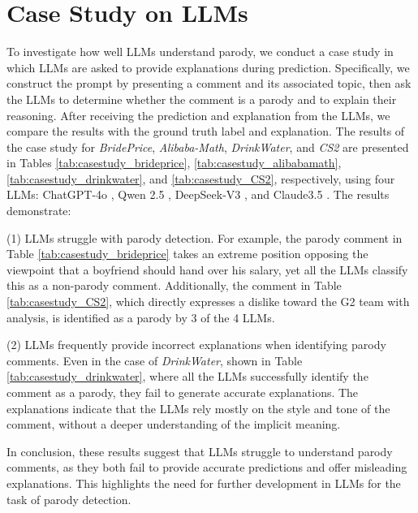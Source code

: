 \section{Case Study on LLMs}\label{apd:sec_case_study}
To investigate how well LLMs understand parody, we conduct a case study in which LLMs are asked to provide explanations during prediction. Specifically, we construct the prompt by presenting a comment and its associated topic, then ask the LLMs to determine whether the comment is a parody and to explain their reasoning. After receiving the prediction and explanation from the LLMs, we compare the results with the ground truth label and explanation. The results of the case study for \textit{BridePrice}, \textit{Alibaba-Math}, \textit{DrinkWater}, and \textit{CS2} are presented in Tables \ref{tab:casestudy_brideprice}, \ref{tab:casestudy_alibabamath}, \ref{tab:casestudy_drinkwater}, and \ref{tab:casestudy_CS2}, respectively, using four LLMs: ChatGPT-4o \citep{GPT4}, Qwen 2.5 \citep{Qwen2.5}, DeepSeek-V3 \citep{DeepSeek}, and Claude3.5 \citep{Claude}. The results demonstrate:

(1) LLMs struggle with parody detection. For example, the parody comment in Table \ref{tab:casestudy_brideprice} takes an extreme position opposing the viewpoint that a boyfriend should hand over his salary, yet all the LLMs classify this as a non-parody comment. Additionally, the comment in Table \ref{tab:casestudy_CS2}, which directly expresses a dislike toward the G2 team with analysis, is identified as a parody by 3 of the 4 LLMs.

(2) LLMs frequently provide incorrect explanations when identifying parody comments. Even in the case of \textit{DrinkWater}, shown in Table \ref{tab:casestudy_drinkwater}, where all the LLMs successfully identify the comment as a parody, they fail to generate accurate explanations. The explanations indicate that the LLMs rely mostly on the style and tone of the comment, without a deeper understanding of the implicit meaning.

In conclusion, these results suggest that LLMs struggle to understand parody comments, as they both fail to provide accurate predictions and offer misleading explanations. This highlights the need for further development in LLMs for the task of parody detection.



